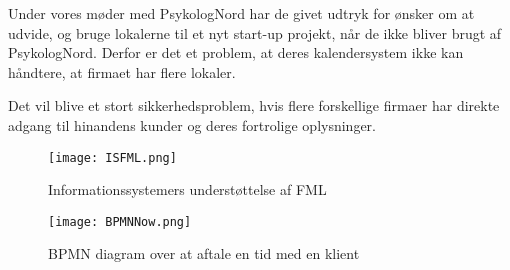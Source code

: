 Under vores møder med PsykologNord har de givet udtryk for ønsker om at udvide, og bruge lokalerne til et nyt start-up projekt, når de ikke bliver brugt af PsykologNord.
Derfor er det et problem, at deres kalendersystem ikke kan håndtere, at firmaet har flere lokaler.

Det vil blive et stort sikkerhedsproblem, hvis flere forskellige firmaer har direkte adgang til hinandens kunder og deres fortrolige oplysninger.



\begin{figure}[H]
    \caption{Informationssystemers understøttelse af FML}
    \centering
        \texttt{[image: ISFML.png]}
    \label{forretning:isfml}
\end{figure}

\begin{figure}
    \caption{BPMN diagram over at aftale en tid med en klient}
    \centering
        \texttt{[image: BPMNNow.png]}
    \label{forretning:bpmnnow}
\end{figure}
